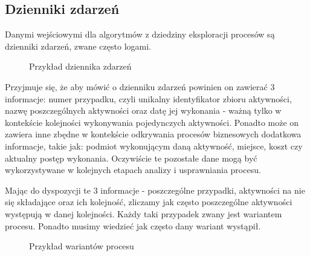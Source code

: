 \subsection{Dzienniki zdarzeń}
\label{sec:event_logs}
Danymi wejściowymi dla algorytmów z dziedziny eksploracji procesów są dzienniki zdarzeń, zwane często logami.
 
\begin{figure}[h]
	\caption{\label{fig:event_log_example}Przykład dziennika zdarzeń}
\end{figure}

Przyjmuje się, że aby mówić o dzienniku zdarzeń powinien on zawierać 3 informacje: numer przypadku, czyli unikalny identyfikator zbioru aktywności, nazwę poszczególnych aktywności oraz datę jej wykonania - ważną tylko w kontekście kolejności wykonywania pojedynczych aktywności. Ponadto może on zawiera inne zbędne w kontekście odkrywania procesów biznesowych dodatkowa informacje, takie jak: podmiot wykonującym daną aktywność, miejsce, koszt czy aktualny postęp wykonania. Oczywiście te pozostałe dane mogą być wykorzystywane w kolejnych etapach analizy i usprawniania procesu.

Mając do dyspozycji te 3 informacje - poszczególne przypadki, aktywności na nie się składające oraz ich kolejność, zliczamy jak często poszczególne aktywności występują w danej kolejności. Każdy taki przypadek zwany jest wariantem procesu. Ponadto musimy wiedzieć jak często dany wariant wystąpił.

\begin{figure}[h]
	\caption{\label{fig:process_variants_example}Przykład wariantów procesu}
\end{figure}

